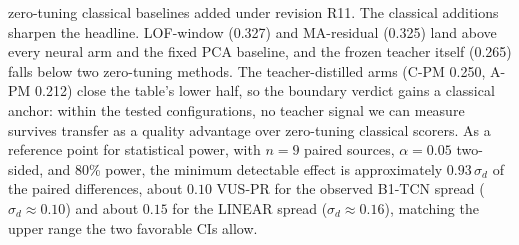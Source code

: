 zero-tuning classical baselines added under revision R11.
The classical additions sharpen the headline.
LOF-window (0.327) and MA-residual (0.325) land above every neural
arm and the fixed PCA baseline, and the frozen teacher itself (0.265)
falls below two zero-tuning methods.
The teacher-distilled arms (C-PM 0.250, A-PM 0.212) close the table's
lower half, so the boundary verdict gains a classical anchor: within
the tested configurations, no teacher signal we can measure survives
transfer as a quality advantage over zero-tuning classical scorers.
As a reference point for statistical power, with $n{=}9$ paired
sources, $\alpha{=}0.05$ two-sided, and 80\% power, the minimum
detectable effect is approximately $0.93\,\sigma_d$ of the paired
differences, about $0.10$ VUS-PR for the observed B1-TCN spread
($\sigma_d{\approx}0.10$) and about $0.15$ for the LINEAR spread
($\sigma_d{\approx}0.16$), matching the upper range the two favorable
CIs allow.

